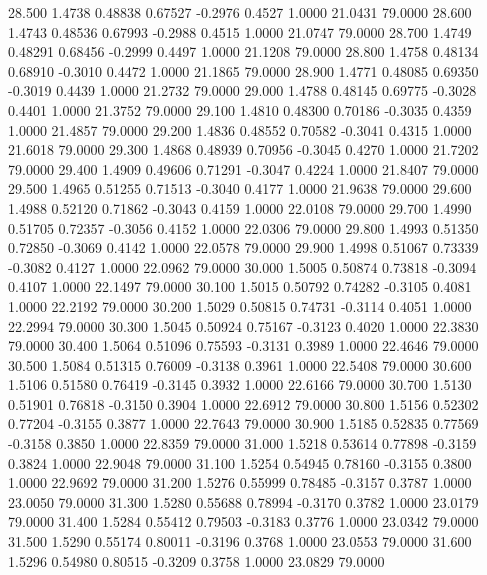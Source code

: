   28.500   1.4738   0.48838   0.67527  -0.2976   0.4527   1.0000  21.0431  79.0000
  28.600   1.4743   0.48536   0.67993  -0.2988   0.4515   1.0000  21.0747  79.0000
  28.700   1.4749   0.48291   0.68456  -0.2999   0.4497   1.0000  21.1208  79.0000
  28.800   1.4758   0.48134   0.68910  -0.3010   0.4472   1.0000  21.1865  79.0000
  28.900   1.4771   0.48085   0.69350  -0.3019   0.4439   1.0000  21.2732  79.0000
  29.000   1.4788   0.48145   0.69775  -0.3028   0.4401   1.0000  21.3752  79.0000
  29.100   1.4810   0.48300   0.70186  -0.3035   0.4359   1.0000  21.4857  79.0000
  29.200   1.4836   0.48552   0.70582  -0.3041   0.4315   1.0000  21.6018  79.0000
  29.300   1.4868   0.48939   0.70956  -0.3045   0.4270   1.0000  21.7202  79.0000
  29.400   1.4909   0.49606   0.71291  -0.3047   0.4224   1.0000  21.8407  79.0000
  29.500   1.4965   0.51255   0.71513  -0.3040   0.4177   1.0000  21.9638  79.0000
  29.600   1.4988   0.52120   0.71862  -0.3043   0.4159   1.0000  22.0108  79.0000
  29.700   1.4990   0.51705   0.72357  -0.3056   0.4152   1.0000  22.0306  79.0000
  29.800   1.4993   0.51350   0.72850  -0.3069   0.4142   1.0000  22.0578  79.0000
  29.900   1.4998   0.51067   0.73339  -0.3082   0.4127   1.0000  22.0962  79.0000
  30.000   1.5005   0.50874   0.73818  -0.3094   0.4107   1.0000  22.1497  79.0000
  30.100   1.5015   0.50792   0.74282  -0.3105   0.4081   1.0000  22.2192  79.0000
  30.200   1.5029   0.50815   0.74731  -0.3114   0.4051   1.0000  22.2994  79.0000
  30.300   1.5045   0.50924   0.75167  -0.3123   0.4020   1.0000  22.3830  79.0000
  30.400   1.5064   0.51096   0.75593  -0.3131   0.3989   1.0000  22.4646  79.0000
  30.500   1.5084   0.51315   0.76009  -0.3138   0.3961   1.0000  22.5408  79.0000
  30.600   1.5106   0.51580   0.76419  -0.3145   0.3932   1.0000  22.6166  79.0000
  30.700   1.5130   0.51901   0.76818  -0.3150   0.3904   1.0000  22.6912  79.0000
  30.800   1.5156   0.52302   0.77204  -0.3155   0.3877   1.0000  22.7643  79.0000
  30.900   1.5185   0.52835   0.77569  -0.3158   0.3850   1.0000  22.8359  79.0000
  31.000   1.5218   0.53614   0.77898  -0.3159   0.3824   1.0000  22.9048  79.0000
  31.100   1.5254   0.54945   0.78160  -0.3155   0.3800   1.0000  22.9692  79.0000
  31.200   1.5276   0.55999   0.78485  -0.3157   0.3787   1.0000  23.0050  79.0000
  31.300   1.5280   0.55688   0.78994  -0.3170   0.3782   1.0000  23.0179  79.0000
  31.400   1.5284   0.55412   0.79503  -0.3183   0.3776   1.0000  23.0342  79.0000
  31.500   1.5290   0.55174   0.80011  -0.3196   0.3768   1.0000  23.0553  79.0000
  31.600   1.5296   0.54980   0.80515  -0.3209   0.3758   1.0000  23.0829  79.0000

